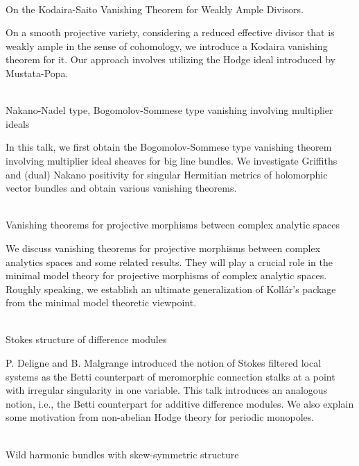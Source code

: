 \documentclass[dvipdfmx,a4paper,12pt]{article}
\theoremstyle{plain} %
\theoremstyle{definition} %
\begin{document}
\\
On the Kodaira-Saito Vanishing Theorem for Weakly Ample Divisors.

\vskip3mm
On a smooth projective variety, considering a reduced effective divisor that is weakly ample in the sense of cohomology, we introduce a Kodaira vanishing theorem for it. Our approach involves utilizing the Hodge ideal introduced by Mustata-Popa.
\vskip6mm

\\
Nakano-Nadel type, Bogomolov-Sommese type vanishing involving multiplier ideals

\vskip3mm
In this talk, we first obtain the Bogomolov-Sommese type vanishing theorem involving multiplier ideal sheaves for big line bundles. We investigate Griffiths and (dual) Nakano positivity for singular Hermitian metrics of holomorphic vector bundles and obtain various vanishing theorems.
\vskip6mm

\newpage 

\vskip3mm

\\
Vanishing theorems for projective morphisms between complex analytic spaces 

\vskip3mm
We discuss vanishing theorems for projective morphisms between complex analytics spaces and some related results. They will play a crucial role in the minimal model theory for projective morphisms of complex analytic spaces. Roughly speaking, we establish an ultimate generalization of Koll\'ar's package from the minimal model theoretic viewpoint.
\vskip6mm

\\
Stokes structure of difference modules

\vskip3mm
P. Deligne and B. Malgrange introduced the notion of Stokes filtered local systems as the Betti counterpart of meromorphic connection stalks at a point with irregular singularity in one variable. This talk introduces an analogous notion, i.e., the Betti counterpart for additive difference modules. We also explain some motivation from non-abelian Hodge theory for periodic monopoles.  
\vskip6mm

\\
Wild harmonic bundles with skew-symmetric structure 
\end{document}
